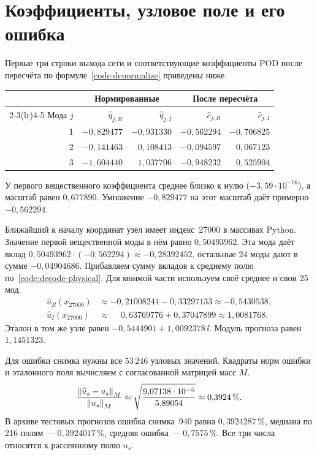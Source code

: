 \clearpage
\section{Коэффициенты, узловое поле и его ошибка}

Первые три строки выхода сети и соответствующие коэффициенты POD
после пересчёта по формуле~\eqref{code:denormalize} приведены ниже.

\begin{center}
\begin{tabular}{@{}r rr rr@{}}
\toprule
& \multicolumn{2}{c}{Нормированные} & \multicolumn{2}{c}{После пересчёта}\\
\cmidrule(lr){2-3}\cmidrule(lr){4-5}
Мода $j$ & $\widehat q_{j,R}$ & $\widehat q_{j,I}$ &
 $\widehat c_{j,R}$ & $\widehat c_{j,I}$\\\midrule
1 & $-0{,}829477$ & $-0{,}931330$ & $-0{,}562294$ & $-0{,}706825$\\
2 & $-0{,}141463$ & $ 0{,}108413$ & $-0{,}094597$ & $ 0{,}067123$\\
3 & $-1{,}604440$ & $ 1{,}037706$ & $-0{,}948232$ & $ 0{,}525904$\\\bottomrule
\end{tabular}
\end{center}

У первого вещественного коэффициента среднее близко к нулю
($-3{,}59\cdot 10^{-16}$), а масштаб равен $0{,}677890$.
Умножение $-0{,}829477$ на этот масштаб даёт примерно $-0{,}562294$.

Ближайший к началу координат узел имеет индекс~27000 в массивах Python.
Значение первой вещественной моды в нём равно $0{,}50493962$.
Эта мода даёт вклад $0{,}50493962\cdot(-0{,}562294)\approx-0{,}28392452$,
остальные 24 моды дают в сумме $-0{,}04904686$. Прибавляем сумму
вкладов к среднему полю по~\eqref{code:decode-physical}. Для мнимой
части используем своё среднее и свои 25 мод.
\begin{align*}
 \widehat u_R(x_{27000})&\approx-0{,}21008244-0{,}33297133\approx-0{,}5430538,\\
 \widehat u_I(x_{27000})&\approx \phantom{-}0{,}63769776+0{,}37047899\approx1{,}0081768.
\end{align*}
Эталон в том же узле равен $-0{,}5444901+1{,}0092378\,\ii$.
Модуль прогноза равен $1{,}1451323$.

Для ошибки снимка нужны все $53\,246$ узловых значений.
Квадраты норм ошибки и эталонного поля вычисляем с согласованной
матрицей масс $M$.
\[
 \frac{\left\lVert \widehat u_s-u_s\right\rVert_M}{\left\lVert u_s\right\rVert_M}
 \approx \sqrt{\frac{9{,}07138\cdot10^{-5}}{5{,}89054}}
 \approx 0{,}3924\,\%.
\]
В архиве тестовых прогнозов ошибка снимка~940 равна $0{,}3924287\,\%$,
медиана по 216 полям --- $0{,}3924017\,\%$, средняя ошибка --- $0{,}7575\,\%$.
Все три числа относятся к рассеянному полю $u_s$.

